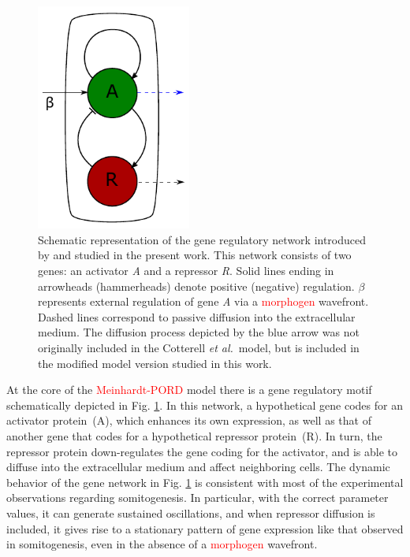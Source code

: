 \documentclass[%
 preprint,
 aip, 
 amsmath,amssymb,
]{revtex4-2}
\begin{document}
	\begin{figure}[t!]
		\centering
		\includegraphics[width=2in]{Figures/Fig01.pdf}
		\caption{Schematic representation of the gene regulatory network introduced by
			\cite{Cotterell2015} and studied in the present work. This network consists of
			two genes: an activator \textit{A} and a repressor \textit{R}. Solid lines
			ending in arrowheads (hammerheads) denote positive (negative) regulation.
			$\beta$ represents external regulation of gene \textit{A} via a 
			\textcolor{red}{morphogen} wavefront. Dashed lines correspond to passive diffusion into the extracellular
			medium. The diffusion process depicted by the blue arrow was not
			originally included in the Cotterell {\em et al.}~model, but is 
			included in the modified model version studied in this work.}
		\label{Fig01}
	\end{figure}
	
At the core of the \textcolor{red}{Meinhardt-PORD} model there is a gene regulatory motif schematically depicted in Fig. \ref{Fig01}. In this network, a hypothetical gene codes for an activator protein~(A), which enhances its own expression, as well as that of another gene that codes for a hypothetical repressor protein~(R). In turn, the repressor protein down-regulates the gene coding for the activator, and is able to diffuse into the extracellular medium and affect neighboring cells. The dynamic behavior of the gene network in Fig. \ref{Fig01} is consistent with most of the experimental observations regarding somitogenesis. In particular, with the correct parameter values, it can generate sustained oscillations, and when repressor diffusion is included, it gives rise to a stationary pattern of gene expression like that observed in somitogenesis, even in the absence of a \textcolor{red}{morphogen} wavefront.
	
\end{document}
